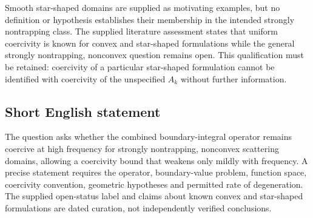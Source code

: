 \documentclass[11pt]{article}
\begin{document}
Smooth star-shaped domains are supplied as motivating examples, but no definition or hypothesis establishes their membership in the intended strongly nontrapping class. The supplied literature assessment states that uniform coercivity is known for convex and star-shaped formulations while the general strongly nontrapping, nonconvex question remains open. This qualification must be retained: coercivity of a particular star-shaped formulation cannot be identified with coercivity of the unspecified \(A_k\) without further information.
\subsection{Short English statement}
The question asks whether the combined boundary-integral operator remains coercive at high frequency for strongly nontrapping, nonconvex scattering domains, allowing a coercivity bound that weakens only mildly with frequency. A precise statement requires the operator, boundary-value problem, function space, coercivity convention, geometric hypotheses and permitted rate of degeneration. The supplied open-status label and claims about known convex and star-shaped formulations are dated curation, not independently verified conclusions.
\end{document}
